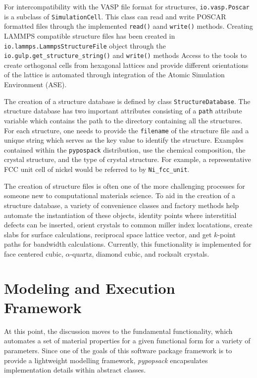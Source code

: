 For intercompatibility with the VASP file format for structures, \verb|io.vasp.Poscar| is a subclass of \verb|SimulationCell|.  This class can read and write POSCAR formatted files through the implemented \verb|read()| aand \verb|write()| methods.
Creating LAMMPS compatible structure files has been created in \verb|io.lammps.LammpsStructureFile| object through the \verb|io.gulp.get_structure_string()| and \verb|write()| methods
Access to the tools to create orthogonal cells from hexagonal lattices and provide different orientations of the lattice is automated through integration of the Atomic Simulation Environment (ASE)\cite{larsen2017_ase}.

The creation of a structure database is defined by class \verb|StructureDatabase|.  The structure database has two important attributes consisting of a \verb|path| attribute variable which contains the path to the directory containing all the structures.  For each structure, one needs to provide the \verb|filename| of the structure file and a unique string which serves as the key value to identify the structure.  Examples contained within the \verb|pypospack| distribution, use the chemical composition, the crystal structure, and the type of crystal structure.  For example, a representative FCC unit cell of nickel would be referred to by \verb|Ni_fcc_unit|.

The creation of structure files is often one of the more challenging processes for someone new to computational materials science.  To aid in the creation of a structure database, a variety of convenience classes and factory methods help automate the instantiation of these objects, identity points where interstitial defects can be inserted, orient crystals to common miller index locatations, create slabs for surface calculations, reciprocal space lattice vector, and get $k$-point paths for bandwidth calculations.  Currently, this functionality is implemented for face centered cubic, $\alpha$-quartz, diamond cubic, and rocksalt crystals.

\section{Modeling and Execution Framework}
\label{sec:potential_evalaution}

At this point, the discussion moves to the fundamental functionality, which automates a set of material properties for a given functional form for a variety of parameters.  Since one of the goals of this software package framework is to provide a lightweight modelling framework, \emph{pypopsack} encapsulates implementation details within abstract classes.

